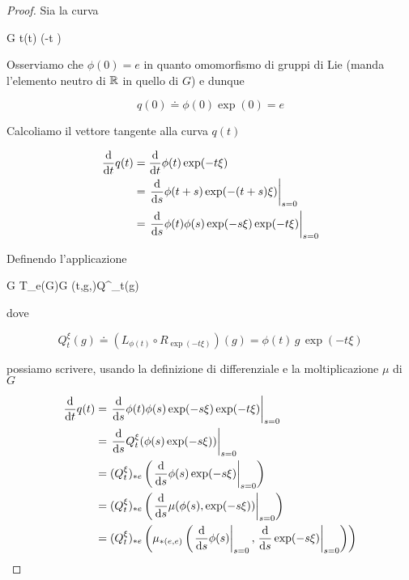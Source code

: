 \begin{proof}
	Sia la curva
	
		{\R}{G}
		{t}{\phi(t) \exp(-t \xi)}
		
	Osserviamo che $ \phi(0) = e $ in quanto omomorfismo di gruppi di Lie (manda l'elemento neutro di $ \mathbb{R} $ in quello di $ G $) e dunque
	
	\begin{equation}
		q(0) \doteq \phi(0) \exp(0) = e
	\end{equation}
	
	Calcoliamo il vettore tangente alla curva $ q(t) $
	
	\begin{align}
		\begin{split}
			\dv{t} q(t) &= \dv{t} \phi(t) \exp(-t \xi) \\
			&= \eval{ \dv{s} \phi(t+s) \exp(- (t+s) \xi) }_{s=0} \\
			&= \eval{ \dv{s} \phi(t) \phi(s) \exp(-s \xi) \exp(-t \xi) }_{s=0}
		\end{split}
	\end{align}

	Definendo l'applicazione
	
		{\R \times G \times T_{e}(G)}{G}
		{(t,g,\xi)}{Q^{\xi}_{t}(g)}
	
	dove
	
	\begin{equation}
		Q^{\xi}_{t}(g) \doteq (L_{\phi(t)} \circ R_{\exp(-t \xi)})(g) = \phi(t) \, g \, \exp(-t \xi)
	\end{equation}
	
	possiamo scrivere, usando la definizione di differenziale e la moltiplicazione $ \mu $ di $ G $
	
	\begin{align}
		\begin{split}
			\dv{t} q(t) &= \eval{ \dv{s} \phi(t) \phi(s) \exp(-s \xi) \exp(-t \xi) }_{s=0} \\
			&= \eval{ \dv{s} Q^{\xi}_{t} (\phi(s) \exp(-s \xi)) }_{s=0} \\
			&= (Q^{\xi}_{t})_{*e} \left( \eval{ \dv{s} \phi(s) \exp(-s \xi) }_{s=0} \right) \\
			&= (Q^{\xi}_{t})_{*e} \left( \eval{ \dv{s} \mu(\phi(s), \exp(-s \xi)) }_{s=0} \right) \\
			&= (Q^{\xi}_{t})_{*e} \left( \mu_{*(e,e)} \left( \eval{ \dv{s} \phi(s) }_{s=0}, \eval{ \dv{s} \exp(-s \xi) }_{s=0} \right) \right)
		\end{split}
	\end{align}


\end{proof}
